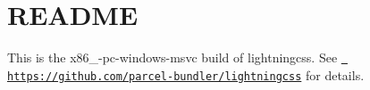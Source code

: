 \chapter{README}
\hypertarget{md__project5___h_r_2_project5___h_r___front___end_2node__modules_2lightningcss-win32-x64-msvc_2_r_e_a_d_m_e}{}\label{md__project5___h_r_2_project5___h_r___front___end_2node__modules_2lightningcss-win32-x64-msvc_2_r_e_a_d_m_e}
This is the x86\+\_-\/pc-\/windows-\/msvc build of lightningcss. See \href{https://github.com/parcel-bundler/lightningcss}{\texttt{ https\+://github.\+com/parcel-\/bundler/lightningcss}} for details. 